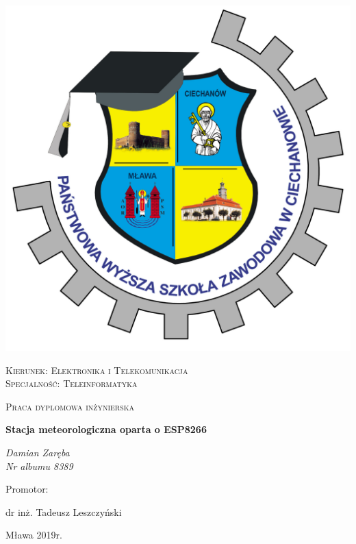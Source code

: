 \documentclass[12pt,a4paper]{scrartcl}
\begin{document}
	\begin{titlepage}
		\centering
		\includegraphics[scale=0.1]{images/logo.jpg}\par\vspace{1cm}
		{\scshape\LARGE Kierunek: Elektronika i Telekomunikacja\\ Specjalność: Teleinformatyka \par}
		\vspace{1cm}
		{\scshape\Large Praca dyplomowa inżynierska\par}
		\vspace{1.5cm}
		{\huge\bfseries Stacja meteorologiczna oparta o ESP8266\par}
		\vspace{2cm}
		{\Large\itshape Damian Zaręba\\Nr albumu 8389\par}
		\vfill
		Promotor:\par
		dr inż. Tadeusz Leszczyński
		
		\vfill
		
		{\large Mława 2019r. \par}
	\end{titlepage}
\tableofcontents
\newpage
\end{document}
